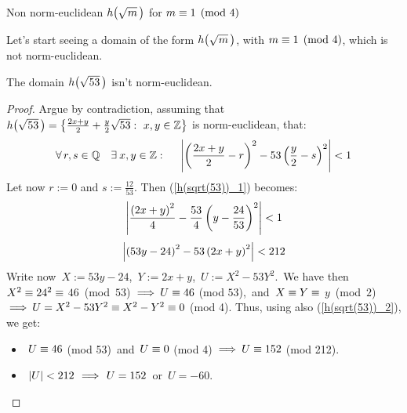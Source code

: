 \smallskip
\begin{subsection}{Non norm-euclidean $\hh{m}$ for $m\equiv 1 \pmod 4$}

Let's start seeing a domain of the form $\hh{m}$, with
$m \equiv 1 \pmod 4$, which is not norm-euclidean.

\begin{thm}\label{h(sqrt(53))_not_norm-euclidean}
The domain $\hh{53}$ isn't norm-euclidean.
\end{thm}

\begin{proof}
%
Argue by contradiction, assuming that $
\hh{53} = \left\{ \frac{2x + y}{2} +
\frac{y}{2}\sqrt{53}:\ x,y \in \Z \right\}
$ is norm-euclidean, \ie that:
\begin{equation}\label{h(sqrt(53))_1}
\forall\, r,s \in \mathbb{Q}\quad \exists\: x,y \in \mathbb{Z} :\quad
\ \left| \left(\frac{2x + y}{2} -r \right)^2
- 53\left(\frac{y}{2} - s\right)^2 \right| < 1
\end{equation}
Let now $r:= 0$ and $s:= \frac{12}{53}$. Then
(\ref{h(sqrt(53))_1}) becomes:
\begin{equation*}
\left| \frac{\left(2x + y\right)^2}{4}
- \frac{53}{4}\left(y - \frac{24}{53}\right)^2 \right| < 1
\end{equation*}
\ie
\begin{equation}\label{h(sqrt(53))_2}
\left|
\left(53 y - 24\right)^2 - 53 \left(2x + y\right)^2
\right| < 212
\end{equation}
%
Write now \,$X:= 53y - 24$,\, $Y:=2x + y$,\,
$U:=X^2 - 53Y^2$.\, We have then\,
$X^2 \equiv 24^2 \equiv$ \mbox{$46$ (mod $53$)}
$\:\Longrightarrow\: U \equiv 46$ (mod $53$),\, and\,
$X \equiv Y \equiv$ \mbox{$y$ (mod $2$)} $\:\Longrightarrow\:
U = X^2 - 53Y^2 \equiv X^2 - Y^2 \equiv 0$ (mod 4).
Thus, using also (\ref{h(sqrt(53))_2}), we get:

\begin{itemize}

\item $\;U\equiv 46$ (mod 53)\, and\, $U\equiv 0$
(mod 4) $\:\Longrightarrow\: U \equiv 152$ (mod 212).

\item $\;\left|U\right| < 212\,\:\Longrightarrow\:\,U = 152$\, or\, $U = -60$.


\end{itemize}
\end{proof}
\end{subsection}
